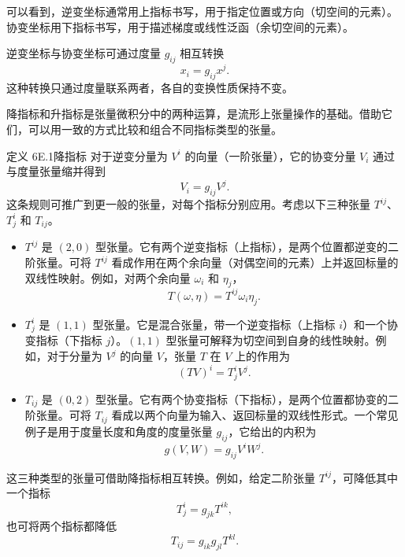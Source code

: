 可以看到，逆变坐标通常用上指标书写，用于指定位置或方向（切空间的元素）。协变坐标用下指标书写，用于描述梯度或线性泛函（余切空间的元素）。

逆变坐标与协变坐标可通过度量 $g_{ij}$ 相互转换
\begin{equation*}
  x_i=g_{ij}x^j.
  \tag{E1}\label{eq:6E1}
\end{equation*}
这种转换只通过度量联系两者，各自的变换性质保持不变。

降指标和升指标是张量微积分中的两种运算，是流形上张量操作的基础。借助它们，可以用一致的方式比较和组合不同指标类型的张量。

\begin{statement}{定义 6E.1}{降指标}
对于逆变分量为 $V^i$ 的向量（一阶张量），它的协变分量 $V_i$ 通过与度量张量缩并得到
\begin{equation*}
  V_i=g_{ij}V^j.
  \tag{6E2}\label{eq:6E2}
\end{equation*}
这条规则可推广到更一般的张量，对每个指标分别应用。考虑以下三种张量 $T^{ij}$、$T^i_j$ 和 $T_{ij}$。
\begin{itemize}
\item $T^{ij}$ 是 $(2,0)$ 型张量。它有两个逆变指标（上指标），是两个位置都逆变的二阶张量。可将 $T^{ij}$ 看成作用在两个余向量（对偶空间的元素）上并返回标量的双线性映射。例如，对两个余向量 $\omega_i$ 和 $\eta_j$，
\[
  T(\omega,\eta)=T^{ij}\omega_i\eta_j.
\]
\item $T^i_j$ 是 $(1,1)$ 型张量。它是混合张量，带一个逆变指标（上指标 $i$）和一个协变指标（下指标 $j$）。$(1,1)$ 型张量可解释为切空间到自身的线性映射。例如，对于分量为 $V^j$ 的向量 $V$，张量 $T$ 在 $V$ 上的作用为
\[
  (TV)^i=T^i_jV^j.
\]
\item $T_{ij}$ 是 $(0,2)$ 型张量。它有两个协变指标（下指标），是两个位置都协变的二阶张量。可将 $T_{ij}$ 看成以两个向量为输入、返回标量的双线性形式。一个常见例子是用于度量长度和角度的度量张量 $g_{ij}$，它给出的内积为
\[
  g(V,W)=g_{ij}V^iW^j.
\]
\end{itemize}
\end{statement}
这三种类型的张量可借助降指标相互转换。例如，给定二阶张量 $T^{ij}$，可降低其中一个指标
\[
  T^i_j=g_{jk}T^{ik},
\]
也可将两个指标都降低
\[
  T_{ij}=g_{ik}g_{jl}T^{kl}.
\]

